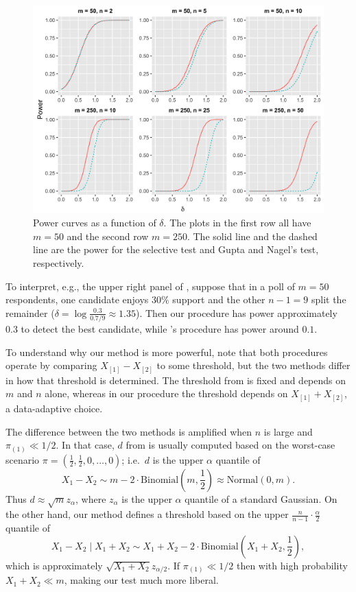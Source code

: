 \documentclass[aos, authoryear]{imsart}
\theoremstyle{definition}
\theoremstyle{custom}
\begin{document}
\begin{figure}[htbp]
\centering
\includegraphics[width = \textwidth]{multinomial-power.png}
\caption{Power curves as a function of $\delta$. The plots in the first row all have $m = 50$ and the second row $m = 250$. The solid line and the dashed line are the power for the selective test and Gupta and Nagel's test, respectively.}
\label{fig:power}
\end{figure}

To interpret, e.g., the upper right panel of , suppose that in a poll of $m = 50$ respondents, one candidate enjoys $30\%$ support and the other $n - 1 = 9$ split the remainder ($\delta = \log\frac{0.3}{0.7 / 9} \approx 1.35$). Then our procedure has power approximately $0.3$ to detect the best candidate, while \citeauthor{Gupta:1967wg}'s procedure has power around $0.1$.

To understand why our method is more powerful, note that both procedures operate by comparing $X_{[1]}-X_{[2]}$ to some threshold, but the two methods differ in how that threshold is determined. The threshold from \citet{Gupta:1967wg} is fixed and depends on $m$ and $n$ alone, whereas in our procedure the threshold depends on $X_{[1]}+X_{[2]}$, a data-adaptive choice. 

The difference between the two methods is amplified when $n$ is large and $\pi_{(1)} \ll 1/2$. In that case, $d$ from \citeauthor{Gupta:1967wg} is usually computed based on the worst-case scenario $\pi = \left(\frac{1}{2}, \frac{1}{2}, 0, \ldots, 0\right)$; i.e.\ $d$ is the upper $\alpha$ quantile of
\[X_1 - X_2 \sim m - 2 \cdot \text{Binomial}\left(m, \frac{1}{2}\right) \approx \text{Normal}\left(0, m\right).\]
Thus $d \approx \sqrt{m} z_\alpha$, where $z_\alpha$ is the upper $\alpha$ quantile of a standard Gaussian. On the other hand, our method defines a threshold based on the upper $\frac{n}{n-1} \cdot \frac{\alpha}{2}$ quantile of
\[X_1 - X_2 \mid X_1 + X_2 \sim X_1 + X_2 - 2 \cdot \text{Binomial}\left(X_1 + X_2, \frac{1}{2}\right),\]
which is approximately $\sqrt{X_1 + X_2} z_{\alpha / 2}$. If $\pi_{(1)} \ll 1/2$ then with high probability $X_1 + X_2 \ll  m$, making our test much more liberal.
\end{document}
